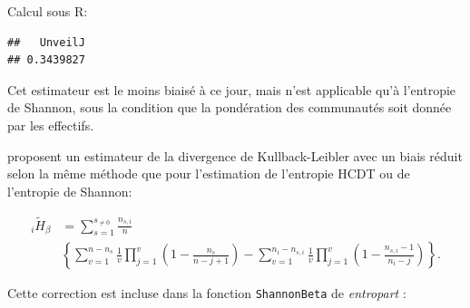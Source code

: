 \documentclass[
  11pt,
  french,
  a4paper,
  extrafontsizes,onecolumn,openright
  ]{memoir}
\newenvironment{Shaded}{\begin{snugshade}}{\end{snugshade}}
\newcommand{\CommentTok}[1]{\textcolor[rgb]{0.56,0.35,0.01}{\textit{#1}}}
\newcommand{\DataTypeTok}[1]{\textcolor[rgb]{0.13,0.29,0.53}{#1}}
\newcommand{\DecValTok}[1]{\textcolor[rgb]{0.00,0.00,0.81}{#1}}
\newcommand{\KeywordTok}[1]{\textcolor[rgb]{0.13,0.29,0.53}{\textbf{#1}}}
\newcommand{\NormalTok}[1]{#1}
\newcommand{\OperatorTok}[1]{\textcolor[rgb]{0.81,0.36,0.00}{\textbf{#1}}}
\newcommand{\StringTok}[1]{\textcolor[rgb]{0.31,0.60,0.02}{#1}}
\begin{document}
Calcul sous R:

\scriptsize

\begin{Shaded}
\end{Shaded}

\begin{verbatim}
##   UnveilJ 
## 0.3439827
\end{verbatim}

\normalsize

Cet estimateur est le moins biaisé à ce jour, mais n'est applicable qu'à l'entropie de Shannon, sous la condition que la pondération des communautés soit donnée par les effectifs.

\textcite{Zhang2014a} proposent un estimateur de la divergence de Kullback-Leibler avec un biais réduit selon la même méthode que pour l'estimation de l'entropie HCDT ou de l'entropie de Shannon:

\begin{align}
  \label{eq:Zhang2014a}
  _{i}\tilde{H}_{\beta} 
  &= \sum^{s_{\ne 0}}_{s=1}{\frac{n_{s,i}}{n} }\\
    &\left\{ \sum^{n-n_s}_{v=1}{\frac{1}{v} \prod^v_{j=1}{ \left( 1-\frac{n_s}{n-j+1} \right) }}
     -  \sum^{n_i-n_{s,i}}_{v=1}{\frac{1}{v} \prod^v_{j=1}{\left( 1-\frac{n_{s,i}-1}{n_i-j} \right) }} \right\}.
\end{align}

Cette correction est incluse dans la fonction \texttt{ShannonBeta} de \emph{entropart} :

\scriptsize

\begin{Shaded}
\end{Shaded}
\end{document}
